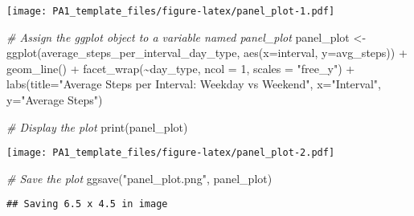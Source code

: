 \documentclass[
]{article}
\newenvironment{Shaded}{\begin{snugshade}}{\end{snugshade}}
\newcommand{\AttributeTok}[1]{\textcolor[rgb]{0.77,0.63,0.00}{#1}}
\newcommand{\CommentTok}[1]{\textcolor[rgb]{0.56,0.35,0.01}{\textit{#1}}}
\newcommand{\DecValTok}[1]{\textcolor[rgb]{0.00,0.00,0.81}{#1}}
\newcommand{\FunctionTok}[1]{\textcolor[rgb]{0.00,0.00,0.00}{#1}}
\newcommand{\NormalTok}[1]{#1}
\newcommand{\OtherTok}[1]{\textcolor[rgb]{0.56,0.35,0.01}{#1}}
\newcommand{\SpecialCharTok}[1]{\textcolor[rgb]{0.00,0.00,0.00}{#1}}
\newcommand{\StringTok}[1]{\textcolor[rgb]{0.31,0.60,0.02}{#1}}
\begin{document}
\texttt{[image: PA1\_template\_files/figure-latex/panel\_plot-1.pdf]}

\begin{Shaded}
\begin{Highlighting}[]
\CommentTok{\# Assign the ggplot object to a variable named panel\_plot}
\NormalTok{panel\_plot }\OtherTok{\textless{}{-}} \FunctionTok{ggplot}\NormalTok{(average\_steps\_per\_interval\_day\_type, }\FunctionTok{aes}\NormalTok{(}\AttributeTok{x=}\NormalTok{interval, }\AttributeTok{y=}\NormalTok{avg\_steps)) }\SpecialCharTok{+}
  \FunctionTok{geom\_line}\NormalTok{() }\SpecialCharTok{+}
  \FunctionTok{facet\_wrap}\NormalTok{(}\SpecialCharTok{\textasciitilde{}}\NormalTok{day\_type, }\AttributeTok{ncol =} \DecValTok{1}\NormalTok{, }\AttributeTok{scales =} \StringTok{"free\_y"}\NormalTok{) }\SpecialCharTok{+}
  \FunctionTok{labs}\NormalTok{(}\AttributeTok{title=}\StringTok{"Average Steps per Interval: Weekday vs Weekend"}\NormalTok{, }\AttributeTok{x=}\StringTok{"Interval"}\NormalTok{, }\AttributeTok{y=}\StringTok{"Average Steps"}\NormalTok{)}

\CommentTok{\# Display the plot}
\FunctionTok{print}\NormalTok{(panel\_plot)}
\end{Highlighting}
\end{Shaded}

\texttt{[image: PA1\_template\_files/figure-latex/panel\_plot-2.pdf]}

\begin{Shaded}
\begin{Highlighting}[]
\CommentTok{\# Save the plot}
\FunctionTok{ggsave}\NormalTok{(}\StringTok{"panel\_plot.png"}\NormalTok{, panel\_plot)}
\end{Highlighting}
\end{Shaded}

\begin{verbatim}
## Saving 6.5 x 4.5 in image
\end{verbatim}
\end{document}
